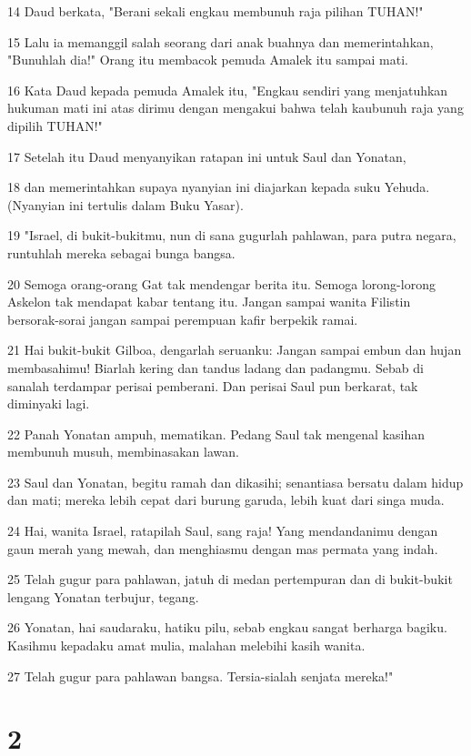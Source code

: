 \par 14 Daud berkata, "Berani sekali engkau membunuh raja pilihan TUHAN!"
\par 15 Lalu ia memanggil salah seorang dari anak buahnya dan memerintahkan, "Bunuhlah dia!" Orang itu membacok pemuda Amalek itu sampai mati.
\par 16 Kata Daud kepada pemuda Amalek itu, "Engkau sendiri yang menjatuhkan hukuman mati ini atas dirimu dengan mengakui bahwa telah kaubunuh raja yang dipilih TUHAN!"
\par 17 Setelah itu Daud menyanyikan ratapan ini untuk Saul dan Yonatan,
\par 18 dan memerintahkan supaya nyanyian ini diajarkan kepada suku Yehuda. (Nyanyian ini tertulis dalam Buku Yasar).
\par 19 "Israel, di bukit-bukitmu, nun di sana gugurlah pahlawan, para putra negara, runtuhlah mereka sebagai bunga bangsa.
\par 20 Semoga orang-orang Gat tak mendengar berita itu. Semoga lorong-lorong Askelon tak mendapat kabar tentang itu. Jangan sampai wanita Filistin bersorak-sorai jangan sampai perempuan kafir berpekik ramai.
\par 21 Hai bukit-bukit Gilboa, dengarlah seruanku: Jangan sampai embun dan hujan membasahimu! Biarlah kering dan tandus ladang dan padangmu. Sebab di sanalah terdampar perisai pemberani. Dan perisai Saul pun berkarat, tak diminyaki lagi.
\par 22 Panah Yonatan ampuh, mematikan. Pedang Saul tak mengenal kasihan membunuh musuh, membinasakan lawan.
\par 23 Saul dan Yonatan, begitu ramah dan dikasihi; senantiasa bersatu dalam hidup dan mati; mereka lebih cepat dari burung garuda, lebih kuat dari singa muda.
\par 24 Hai, wanita Israel, ratapilah Saul, sang raja! Yang mendandanimu dengan gaun merah yang mewah, dan menghiasmu dengan mas permata yang indah.
\par 25 Telah gugur para pahlawan, jatuh di medan pertempuran dan di bukit-bukit lengang Yonatan terbujur, tegang.
\par 26 Yonatan, hai saudaraku, hatiku pilu, sebab engkau sangat berharga bagiku. Kasihmu kepadaku amat mulia, malahan melebihi kasih wanita.
\par 27 Telah gugur para pahlawan bangsa. Tersia-sialah senjata mereka!"

\chapter{2}

